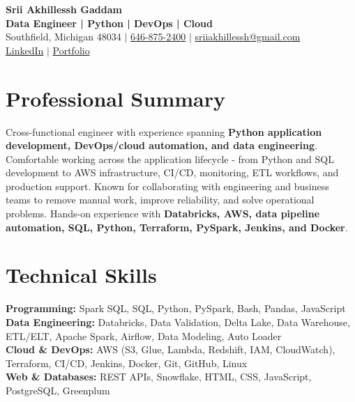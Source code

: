 \documentclass[letterpaper,10pt]{article}
\begin{document}
\fontsize{9.35pt}{10.45pt}\selectfont

\begin{center}
    {\LARGE \textbf{Srii Akhillessh Gaddam}} \\[-1pt]
    \textbf{Data Engineer | Python | DevOps | Cloud} \\[2pt]
    Southfield, Michigan 48034 $|$
    \href{tel:6468752400}{646-875-2400} $|$
    \href{mailto:sriiakhillessh@gmail.com}{sriiakhillessh@gmail.com} \\[1pt]
    \href{https://www.linkedin.com/in/srii-akhiilessh-gaddam-b48668191/}{LinkedIn} $|$
    \href{https://sriiakhillesshg.github.io/portfolio/}{Portfolio}
\end{center}
\vspace{-8pt}

\section{Professional Summary}
\small{Cross-functional engineer with experience spanning \textbf{Python application development, DevOps/cloud automation, and data engineering}. Comfortable working across the application lifecycle - from Python and SQL development to AWS infrastructure, CI/CD, monitoring, ETL workflows, and production support. Known for collaborating with engineering and business teams to remove manual work, improve reliability, and solve operational problems. Hands-on experience with \textbf{Databricks, AWS, data pipeline automation, SQL, Python, Terraform, PySpark, Jenkins, and Docker}.}

\section{Technical Skills}
\small{
\textbf{Programming:} Spark SQL, SQL, Python, PySpark, Bash, Pandas, JavaScript \\
\textbf{Data Engineering:} Databricks, Data Validation, Delta Lake, Data Warehouse, ETL/ELT, Apache Spark, Airflow, Data Modeling, Auto Loader \\
\textbf{Cloud \& DevOps:} AWS (S3, Glue, Lambda, Redshift, IAM, CloudWatch), Terraform, CI/CD, Jenkins, Docker, Git, GitHub, Linux \\
\textbf{Web \& Databases:} REST APIs, Snowflake, HTML, CSS, JavaScript, PostgreSQL, Greenplum
}
\end{document}
